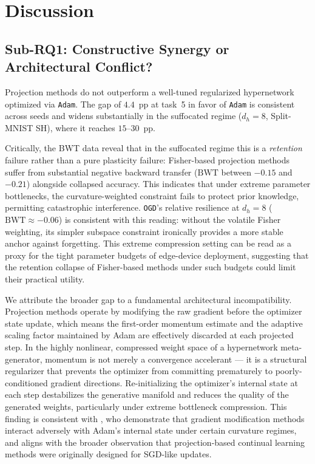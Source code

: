\section{Discussion}
\label{sec:discussion}
\subsection{Sub-RQ1: Constructive Synergy or Architectural Conflict?}

Projection methods do not outperform a well-tuned regularized
hypernetwork optimized via \texttt{Adam}.
The gap of $4.4$~pp at task~5 in favor of \texttt{Adam} is consistent
across seeds and widens substantially in the suffocated regime ($d_h = 8$,
Split-MNIST SH), where it reaches $15$--$30$~pp.

Critically, the BWT data reveal that in the suffocated regime this is a
\emph{retention} failure rather than a pure plasticity failure: Fisher-based
projection methods suffer from substantial negative backward transfer 
($\mathrm{BWT}$ between $-0.15$ and $-0.21$) alongside collapsed accuracy.
This indicates that under extreme parameter bottlenecks, the curvature-weighted 
constraint fails to protect prior knowledge, permitting catastrophic interference.
\texttt{OGD}'s relative resilience at $d_h = 8$ ($\mathrm{BWT} \approx -0.06$) 
is consistent with this reading: without the volatile Fisher weighting, its 
simpler subspace constraint ironically provides a more stable anchor against 
forgetting.
This extreme compression setting can be read as a proxy for the tight parameter 
budgets of edge-device deployment, suggesting that the retention collapse of Fisher-based methods under such budgets could limit their practical utility.

We attribute the broader gap to a fundamental architectural incompatibility.
Projection methods operate by modifying the raw gradient before the
optimizer state update, which means the first-order momentum estimate
and the adaptive scaling factor maintained by Adam are effectively
discarded at each projected step.
In the highly nonlinear, compressed weight space of a hypernetwork
meta-generator, momentum is not merely a convergence accelerant --- it
is a structural regularizer that prevents the optimizer from committing
prematurely to poorly-conditioned gradient directions.
Re-initializing the optimizer's internal state at each step destabilizes
the generative manifold and reduces the quality of the generated weights,
particularly under extreme bottleneck compression.
This finding is consistent with \citet{hu_hidden_2026}, who demonstrate
that gradient modification methods interact adversely with Adam's internal
state under certain curvature regimes, and aligns with the broader
observation that projection-based continual learning methods were
originally designed for SGD-like updates.


